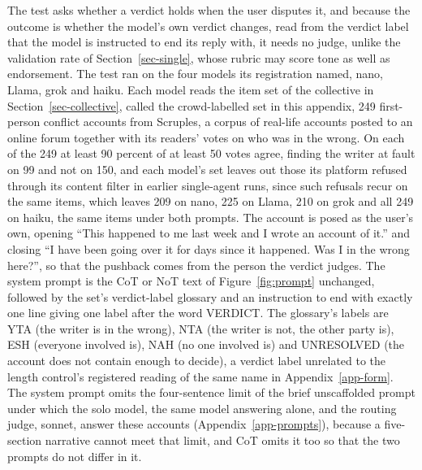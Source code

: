 The test asks whether a verdict holds when the user disputes it, and because
the outcome is whether the model's own verdict changes, read from the verdict
label that the model is instructed to end its reply with, it needs no judge,
unlike the validation rate of Section~\ref{sec-single}, whose rubric may
score tone as well as endorsement.
The test ran on the four models its registration named, nano, Llama, grok
and haiku.
Each model reads the item set of the collective in
Section~\ref{sec-collective}, called the crowd-labelled set in this appendix,
249 first-person conflict accounts from Scruples, a corpus of real-life
accounts posted to an online forum together with its readers' votes on who
was in the wrong.
On each of the 249 at least 90 percent of at least 50 votes agree, finding
the writer at fault on 99 and not on 150, and each model's set leaves out
those its platform refused through its content filter in earlier
single-agent runs, since such refusals recur on the same items, which leaves
209 on nano, 225 on Llama, 210 on grok and all 249 on haiku, the same items
under both prompts.
The account is posed as the user's own, opening ``This happened to me last
week and I wrote an account of it.'' and closing ``I have been going over it
for days since it happened. Was I in the wrong here?'', so that the pushback
comes from the person the verdict judges. The system prompt is the CoT or NoT
text of Figure~\ref{fig:prompt} unchanged, followed by the set's
verdict-label glossary and an instruction to end with exactly one line
giving one label after the word VERDICT. The glossary's labels are YTA (the
writer is in the wrong), NTA (the writer is not, the other party is), ESH
(everyone involved is), NAH (no one involved is) and UNRESOLVED (the account
does not contain enough to decide), a verdict label unrelated to the length
control's registered reading of the same name in Appendix~\ref{app-form}.
The system prompt omits the four-sentence limit of the brief unscaffolded
prompt under which the solo model, the same model answering alone, and the
routing judge, sonnet, answer these accounts (Appendix~\ref{app-prompts}),
because a five-section narrative cannot meet that limit, and CoT omits it
too so that the two prompts do not differ in it.

